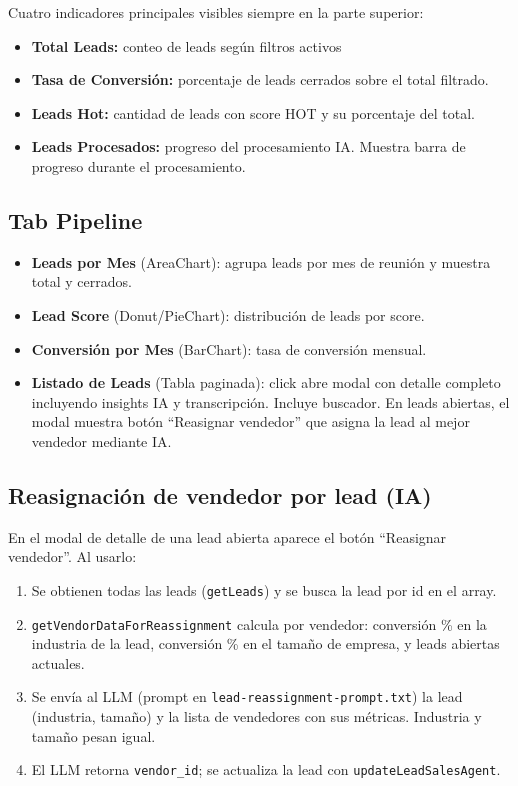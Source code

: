 \documentclass[11pt,a4paper]{article}
\begin{document}
Cuatro indicadores principales visibles siempre en la parte superior:

\begin{itemize}[noitemsep]
  \item \textbf{Total Leads:} conteo de leads según filtros activos
  \item \textbf{Tasa de Conversión:} porcentaje de leads cerrados sobre el total filtrado.
  \item \textbf{Leads Hot:} cantidad de leads con score HOT y su porcentaje del total.
  \item \textbf{Leads Procesados:} progreso del procesamiento IA. Muestra barra de progreso durante el procesamiento.
\end{itemize}

\subsection{Tab Pipeline}

\begin{itemize}[noitemsep]
  \item \textbf{Leads por Mes} (AreaChart): agrupa leads por mes de reunión y muestra total y cerrados.
  \item \textbf{Lead Score} (Donut/PieChart): distribución de leads por score.
  \item \textbf{Conversión por Mes} (BarChart): tasa de conversión mensual.
  \item \textbf{Listado de Leads} (Tabla paginada): click abre modal con detalle completo incluyendo insights IA y transcripción. Incluye buscador. En leads abiertas, el modal muestra botón ``Reasignar vendedor'' que asigna la lead al mejor vendedor mediante IA.
\end{itemize}

\subsection{Reasignación de vendedor por lead (IA)}

En el modal de detalle de una lead abierta aparece el botón ``Reasignar vendedor''. Al usarlo:

\begin{enumerate}[noitemsep]
  \item Se obtienen todas las leads (\texttt{getLeads}) y se busca la lead por id en el array.
  \item \texttt{getVendorDataForReassignment} calcula por vendedor: conversión \% en la industria de la lead, conversión \% en el tamaño de empresa, y leads abiertas actuales.
  \item Se envía al LLM (prompt en \texttt{lead-reassignment-prompt.txt}) la lead (industria, tamaño) y la lista de vendedores con sus métricas. Industria y tamaño pesan igual.
  \item El LLM retorna \texttt{vendor\_id}; se actualiza la lead con \texttt{updateLeadSalesAgent}.
\end{enumerate}
\end{document}
